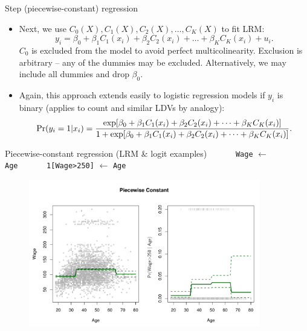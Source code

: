 \documentclass{beamer}
\begin{document}
\begin{frame}{Step (piecewise-constant) regression}
\begin{itemize}
    \item Next, we use $C_0(X), C_1(X), C_2(X), \dots, C_K(X)$ to fit LRM:
    $$y_i = \beta_0 + \beta_1 C_1(x_i) + \beta_2 C_2(x_i) + \dots + \beta_K C_K(x_i) + u_i .$$
    $C_0$ is excluded from the model to avoid perfect multicolinearity. Exclusion is arbitrary -- any of the dummies may be excluded. Alternatively, we may include all dummies and drop $\beta_0$.
    \bigskip
    \item Again, this approach extends easily to logistic regression models if $y_i$ is binary (applies to count and similar LDVs by analogy):
    \small
    $$\textnormal{Pr}(y_i=1|x_i) 
    = \frac{\exp[\beta_0 + \beta_1 C_1(x_i) + \beta_2 C_2(x_i) + \dots + \beta_K C_K(x_i)]}{1 + \exp[\beta_0 + \beta_1 C_1(x_i) + \beta_2 C_2(x_i) + \dots + \beta_K C_K(x_i)]}. $$
\end{itemize}
\end{frame}
\begin{frame}{Piecewise-constant regression (LRM \& logit examples)}
\centering
\medskip
\texttt{~~~~~~Wage} $\leftarrow$ \texttt{Age~~~~~~} \qquad \qquad \texttt{1[Wage>250]} $\leftarrow$ \texttt{Age}\\
\begin{figure}
  \centering
  \includegraphics[trim=0cm 0cm 0cm 0cm, clip=true, width=0.9\textwidth]{IMG/ISLR72.pdf}
\end{figure}
\end{frame}
\end{document}
